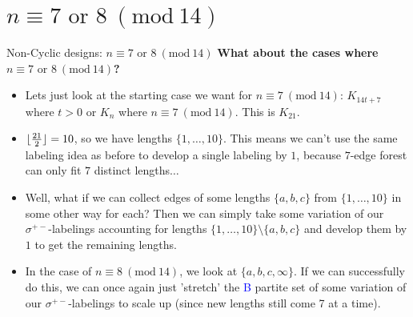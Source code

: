 \documentclass[xcolor=x11names,compress,8pt]{beamer}
\theoremstyle{plain}
\DeclarePairedDelimiter\floor{\lfloor}{\rfloor} %
\newcommand{\Mod}[1]{\ (\mathrm{mod}\ #1)}
\begin{document}
    \section{$n\equiv 7\text{ or }8\Mod{14}$}
    \begin{frame}{Non-Cyclic designs: $n\equiv 7\text{ or }8\Mod{14}$}
        \textbf{What about the cases where $n\equiv 7\text{ or }8\Mod{14}$?}
        \begin{itemize}
            \pause
            
            \item Lets just look at the starting case we want for $n\equiv 7\Mod{14}$: $K_{14t+7}$ where $t>0$ or $K_{n}$ where $n\equiv 7\Mod{14}.$ This is $K_{21}$.
            
            \pause

            \item $\floor{\frac{21}{2}}=10$, so we have lengths $\{1,\hdots, 10\}$. This means we can't use the same labeling idea as before to develop a single labeling by $1$, because $7$-edge forest can only fit $7$ distinct lengths$\hdots$
                        
            \pause
            
            \item Well, what if we can collect edges of some lengths $\{a,b,c\}$ from $\{1,\hdots, 10\}$ in some other way for each? Then we can simply take some variation of our $\sigma^{+-}$-labelings accounting for lengths $\{1,\hdots,10\}\setminus \{a,b,c\}$ and develop them by $1$ to get the remaining lengths.
            
            \pause

            \item In the case of $n\equiv 8\Mod{14}$, we look at $\{a,b,c,\infty\}$. If we can successfully do this, we can once again just 'stretch' the \textcolor{blue}{B} partite set of some variation of our $\sigma^{+-}$-labelings to scale up (since new lengths still come 7 at a time).

        \end{itemize}

    \end{frame}
\end{document}
